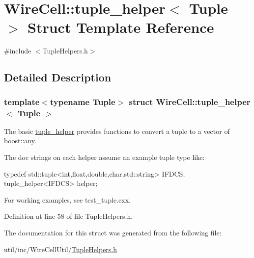 \hypertarget{struct_wire_cell_1_1tuple__helper}{}\section{Wire\+Cell\+:\+:tuple\+\_\+helper$<$ Tuple $>$ Struct Template Reference}
\label{struct_wire_cell_1_1tuple__helper}


{\ttfamily \#include $<$Tuple\+Helpers.\+h$>$}



\subsection{Detailed Description}
\subsubsection*{template$<$typename Tuple$>$\newline
struct Wire\+Cell\+::tuple\+\_\+helper$<$ Tuple $>$}

The basic \hyperlink{struct_wire_cell_1_1tuple__helper}{tuple\+\_\+helper} provides functions to convert a tuple to a vector of boost\+::any.

The doc strings on each helper assume an example tuple type like\+: \begin{DoxyVerb}typedef std::tuple<int,float,double,char,std::string> IFDCS;
tuple_helper<IFDCS> helper;
\end{DoxyVerb}


For working examples, see test\+\_\+tuple.\+cxx. 

Definition at line 58 of file Tuple\+Helpers.\+h.



The documentation for this struct was generated from the following file\+:\begin{DoxyCompactItemize}
\item 
util/inc/\+Wire\+Cell\+Util/\hyperlink{_tuple_helpers_8h}{Tuple\+Helpers.\+h}\end{DoxyCompactItemize}
